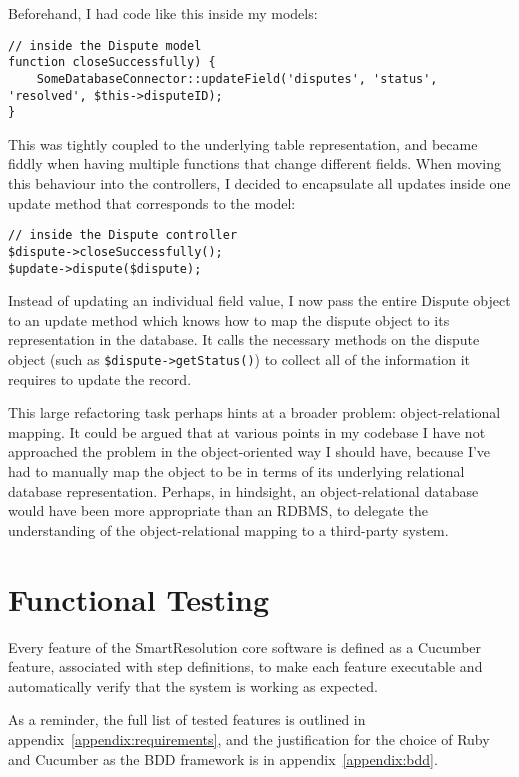 Beforehand, I had code like this inside my models:

\begin{lstlisting}
// inside the Dispute model
function closeSuccessfully) {
    SomeDatabaseConnector::updateField('disputes', 'status', 'resolved', $this->disputeID);
}
\end{lstlisting}

This was tightly coupled to the underlying table representation, and became fiddly when having multiple functions that change different fields. When moving this behaviour into the controllers, I decided to encapsulate all updates inside one update method that corresponds to the model:

\begin{lstlisting}
// inside the Dispute controller
$dispute->closeSuccessfully();
$update->dispute($dispute);
\end{lstlisting}

Instead of updating an individual field value, I now pass the entire Dispute object to an update method which knows how to map the dispute object to its representation in the database. It calls the necessary methods on the dispute object (such as \lstinline{$dispute->getStatus()}) to collect all of the information it requires to update the record. 

This large refactoring task perhaps hints at a broader problem: object-relational mapping. It could be argued that at various points in my codebase I have not approached the problem in the object-oriented way I should have, because I've had to manually map the object to be in terms of its underlying relational database representation. Perhaps, in hindsight, an object-relational database would have been more appropriate than an RDBMS, to delegate the understanding of the object-relational mapping to a third-party system.

\section{Functional Testing}

Every feature of the SmartResolution core software is defined as a Cucumber feature, associated with step definitions, to make each feature executable and automatically verify that the system is working as expected.

As a reminder, the full list of tested features is outlined in appendix~\ref{appendix:requirements}, and the justification for the choice of Ruby and Cucumber as the BDD framework is in appendix~\ref{appendix:bdd}.

